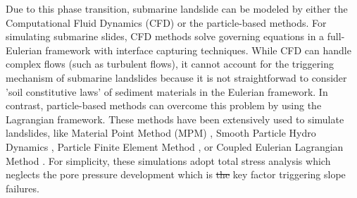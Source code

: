 \documentclass[preprint,12pt]{elsarticle}
\providecommand{\DIFdel}[1]{{\protect\color{red}\sout{#1}}}                      %
\providecommand{\DIFdelbegin}{} %
\providecommand{\DIFdelend}{} %
\newcommand{\DIFscaledelfig}{0.5}
\newlength{\DIFdelgraphicswidth} %
\newlength{\DIFdelgraphicsheight} %
\newcommand{\DIFdelincludegraphics}[2][]{%
\sbox{\DIFdelgraphicsbox}{\DIFOincludegraphics[#1]{#2}}%
\settoboxwidth{\DIFdelgraphicswidth}{\DIFdelgraphicsbox} %
\settoboxtotalheight{\DIFdelgraphicsheight}{\DIFdelgraphicsbox} %
\scalebox{\DIFscaledelfig}{%
\parbox[b]{\DIFdelgraphicswidth}{\usebox{\DIFdelgraphicsbox}\\[-\baselineskip] \rule{\DIFdelgraphicswidth}{0em}}\llap{\resizebox{\DIFdelgraphicswidth}{\DIFdelgraphicsheight}{%
\setlength{\unitlength}{\DIFdelgraphicswidth}%
\begin{picture}(1,1)%
\thicklines\linethickness{2pt} %
{\color[rgb]{1,0,0}\put(0,0){\framebox(1,1){}}}%
{\color[rgb]{1,0,0}\put(0,0){\line( 1,1){1}}}%
{\color[rgb]{1,0,0}\put(0,1){\line(1,-1){1}}}%
\end{picture}%
}\hspace*{3pt}}} %
} %
\DeclareRobustCommand{\DIFdelbegin}{\DIFOdelbegin \let\includegraphics\DIFdelincludegraphics} %
\DeclareRobustCommand{\DIFdelend}{\DIFOaddend \let\includegraphics\DIFOincludegraphics} %
\begin{document}
Due to this phase transition, submarine landslide can be modeled by either the Computational Fluid Dynamics (CFD) or the particle-based methods. For simulating submarine slides, CFD methods solve governing equations in a full-Eulerian framework \cite{CFD1, CFD2,CFD3, CFD4} with interface capturing techniques. While CFD can handle complex flows (such as turbulent flows), it cannot account for the triggering mechanism of submarine landslides because it is not straightforwad to consider 'soil constitutive laws' of sediment materials in the Eulerian framework. In contrast, particle-based methods can overcome this problem by using the Lagrangian framework. These methods have been extensively used to simulate landslides, like Material Point Method (MPM) \cite{Tran2019}, Smooth Particle Hydro Dynamics \cite{Capone2010}, Particle Finite Element Method \cite{Zhang2019}, or Coupled Eulerian Lagrangian Method \cite{Dey2016}. For simplicity, these simulations adopt total stress analysis which neglects the pore pressure development which is \DIFdelbegin \DIFdel{the }\DIFdelend key factor triggering slope failures. \\
\end{document}
